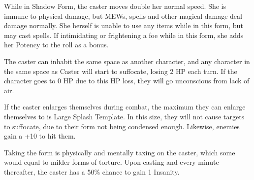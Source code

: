 \documentclass[11pt,a4paper,twocolumn]{book}
\begin{document}
While in Shadow Form, the caster moves double her normal speed. She is immune to physical damage, but MEWs, spells and other magical damage deal damage normally. She herself is unable to use any items while in this form, but may cast spells. If intimidating or frightening a foe while in this form, she adds her Potency to the roll as a bonus.

The caster can inhabit the same space as another character, and any character in the same space as Caster will start to suffocate, losing 2 HP each turn. If the character goes to 0 HP due to this HP loss, they will go unconscious from lack of air.

If the caster enlarges themselves during combat, the maximum they can enlarge themselves to is Large Splash Template. In this size, they will not cause targets to suffocate, due to their form not being condensed enough. Likewise, enemies gain a +10 to hit them.

Taking the form is physically and mentally taxing on the caster, which some would equal to milder forms of torture. Upon casting and every minute thereafter, the caster has a 50\% chance to gain 1 Insanity.

%	
%
%
%
\end{document}
